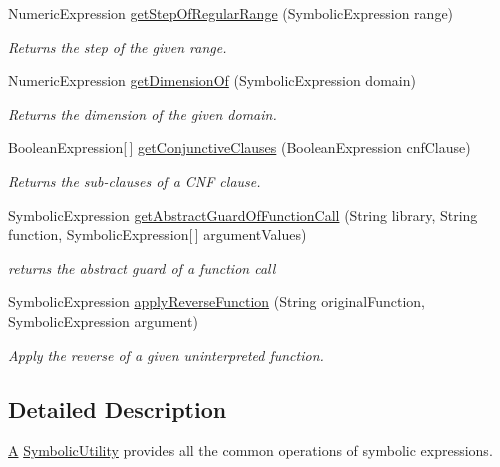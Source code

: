 \begin{DoxyCompactItemize}
Numeric\+Expression \hyperlink{interfaceedu_1_1udel_1_1cis_1_1vsl_1_1civl_1_1dynamic_1_1IF_1_1SymbolicUtility_a73c5ca9ccd6bdfc9884b34d1b6bbc1a2}{get\+Step\+Of\+Regular\+Range} (Symbolic\+Expression range)
\begin{DoxyCompactList}\small\item\em Returns the step of the given range. \end{DoxyCompactList}\item 
Numeric\+Expression \hyperlink{interfaceedu_1_1udel_1_1cis_1_1vsl_1_1civl_1_1dynamic_1_1IF_1_1SymbolicUtility_ae7d21995a1a5e8ece42caf15392f39a3}{get\+Dimension\+Of} (Symbolic\+Expression domain)
\begin{DoxyCompactList}\small\item\em Returns the dimension of the given domain. \end{DoxyCompactList}\item 
Boolean\+Expression\mbox{[}$\,$\mbox{]} \hyperlink{interfaceedu_1_1udel_1_1cis_1_1vsl_1_1civl_1_1dynamic_1_1IF_1_1SymbolicUtility_a57bdff48f226aff63352ac954a796fe2}{get\+Conjunctive\+Clauses} (Boolean\+Expression cnf\+Clause)
\begin{DoxyCompactList}\small\item\em Returns the sub-\/clauses of a C\+N\+F clause. \end{DoxyCompactList}\item 
Symbolic\+Expression \hyperlink{interfaceedu_1_1udel_1_1cis_1_1vsl_1_1civl_1_1dynamic_1_1IF_1_1SymbolicUtility_a4f0912f5c9c28465348043f1ce039c02}{get\+Abstract\+Guard\+Of\+Function\+Call} (String library, String function, Symbolic\+Expression\mbox{[}$\,$\mbox{]} argument\+Values)
\begin{DoxyCompactList}\small\item\em returns the abstract guard of a function call \end{DoxyCompactList}\item 
Symbolic\+Expression \hyperlink{interfaceedu_1_1udel_1_1cis_1_1vsl_1_1civl_1_1dynamic_1_1IF_1_1SymbolicUtility_ab672d2620b3dfc7aa54e184712837cf4}{apply\+Reverse\+Function} (String original\+Function, Symbolic\+Expression argument)
\begin{DoxyCompactList}\small\item\em Apply the reverse of a given uninterpreted function. \end{DoxyCompactList}\end{DoxyCompactItemize}


\subsection{Detailed Description}
\hyperlink{structA}{A} \hyperlink{interfaceedu_1_1udel_1_1cis_1_1vsl_1_1civl_1_1dynamic_1_1IF_1_1SymbolicUtility}{Symbolic\+Utility} provides all the common operations of symbolic expressions. 

